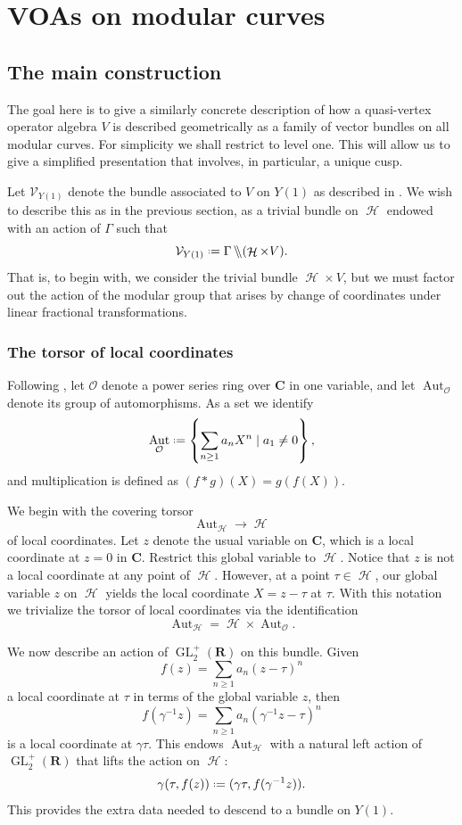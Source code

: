 \documentclass[12pt]{amsart}
\theoremstyle{plain}
\theoremstyle{definition}
\theoremstyle{remark}
\newcommand{\cO}{\mathcal{O}}
\newcommand{\cV}{\mathcal{V}}
\DeclareMathOperator{\uhp}{\mathcal{H}}
\DeclareMathOperator{\Aut}{Aut}
\DeclareMathOperator{\GL}{GL}
\newcommand*{\df}{\mathrel{\vcenter{\baselineskip0.5ex \lineskiplimit0pt
                     \hbox{\scriptsize.}\hbox{\scriptsize.}}} =}
\newcommand{\CC}{\mathbf{C}}
\newcommand{\RR}{\mathbf{R}}
\DeclareMathOperator{\obackslash}{\backslash\hspace{-3pt}\backslash}
\begin{document}
\section{VOAs on modular curves}


\subsection{The main construction}
The goal here is to give a similarly concrete description of how a quasi-vertex operator algebra $V$ is described geometrically as a family of vector bundles on all modular curves. For simplicity we shall restrict to level one. This will allow us to give a simplified presentation that involves, in particular, a unique cusp.

Let $\cV_{Y(1)}$ denote the bundle associated to $V$ on $Y(1)$ as described in \cite{FBZ}. We wish to describe this as in the previous section, as a trivial bundle on $\uhp$ endowed with an action of $\Gamma$ such that
\[
\cV_{Y(1)} \df \Gamma \obackslash (\uhp \times V).
\]
That is, to begin with, we consider the trivial bundle $\uhp \times V$, but we must factor out the action of the modular group that arises by change of coordinates under linear fractional transformations. 

\subsubsection{The torsor of local coordinates} Following \cite{FBZ}, let $\cO$ denote a power series ring over $\CC$ in one variable, and let $\Aut_{\cO}$ denote its group of automorphisms. As a set we identify
\[
\Aut_{\cO} \df \left\{\sum_{n\geq 1} a_nX^n \mid  a_1\neq 0\right\},
\]
and multiplication is defined as $(f*g)(X) = g(f(X))$. 

We begin with the covering torsor
\[\Aut_{\uhp} \to \uhp\] 
of local coordinates. Let $z$ denote the usual variable on $\CC$, which is a local coordinate at $z=0$ in $\CC$. Restrict this global variable to $\uhp$. Notice that $z$ is not a local coordinate at any point of $\uhp$. However, at a point $\tau \in \uhp$, our global variable $z$ on $\uhp$ yields the local coordinate $X=z-\tau$ at $\tau$. With this notation we trivialize the torsor of local coordinates via the identification
\[
\Aut_{\uhp} = \uhp \times \Aut_{\cO}.
\]

We now describe an action of $\GL_2^+(\RR)$ on this bundle. Given 
\[f(z) = \sum_{n\geq 1} a_n(z-\tau)^n\] 
a local coordinate at $\tau$ in terms of the global variable $z$, then
\[
f(\gamma^{-1}z) = \sum_{n\geq 1} a_n(\gamma^{-1}z-\tau)^n
\]
is a local coordinate at $\gamma \tau$. This endows $\Aut_{\uhp}$ with a natural left action of $\GL_2^+(\RR)$ that lifts the action on $\uhp$:
\[
\gamma (\tau,f(z)) \df (\gamma \tau, f(\gamma^{-1} z)).
\]
This provides the extra data needed to descend to a bundle on $Y(1)$. 
\end{document}
